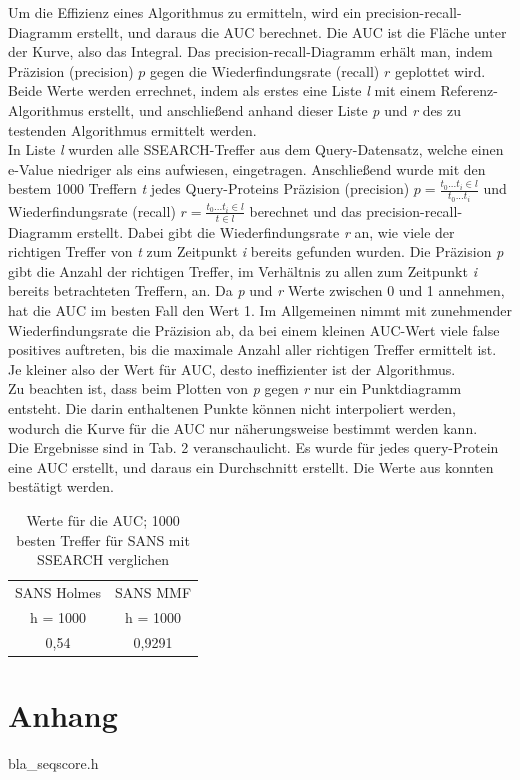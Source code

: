 \documentclass{article}
\begin{document}
Um die Effizienz eines Algorithmus zu ermitteln, wird ein precision-recall-Diagramm erstellt, und daraus die AUC berechnet. Die AUC ist die Fläche unter der Kurve, also das Integral. Das precision-recall-Diagramm erhält man, indem Präzision (precision) $p$ gegen die Wiederfindungsrate (recall) $r$ geplottet wird. Beide Werte werden errechnet, indem als erstes eine Liste \textit l mit einem Referenz-Algorithmus erstellt, und anschließend anhand dieser Liste \textit p und \textit r des zu testenden Algorithmus ermittelt werden.\\In Liste \textit l wurden alle SSEARCH-Treffer aus dem Query-Datensatz, welche einen e-Value niedriger als eins aufwiesen, eingetragen. Anschließend wurde mit den bestem 1000 Treffern \textit t jedes Query-Proteins Präzision (precision) $p = \frac{t_0 ... t_i \in l}{t_0 ... t_i}$ und Wiederfindungsrate (recall) $r = \frac {t_0 ... t_i \in l}{t \in l}$ berechnet und das precision-recall-Diagramm erstellt. Dabei gibt die Wiederfindungsrate \textit r an, wie viele der richtigen Treffer von \textit t zum Zeitpunkt \textit i bereits gefunden wurden. Die Präzision \textit p gibt die Anzahl der richtigen Treffer, im Verhältnis zu allen zum Zeitpunkt \textit i bereits betrachteten Treffern, an. Da \textit p und \textit r Werte zwischen 0 und 1 annehmen, hat die AUC im besten Fall den Wert 1. Im Allgemeinen nimmt mit zunehmender Wiederfindungsrate die Präzision ab, da bei einem kleinen AUC-Wert viele false positives auftreten, bis die maximale Anzahl aller richtigen Treffer ermittelt ist. Je kleiner also der Wert für AUC, desto ineffizienter ist der Algorithmus.\\Zu beachten ist, dass beim Plotten von \textit p gegen \textit r nur ein Punktdiagramm entsteht. Die darin enthaltenen Punkte können nicht interpoliert werden, wodurch die Kurve für die AUC nur näherungsweise bestimmt werden kann.\\Die Ergebnisse sind in Tab. 2 veranschaulicht. Es wurde für jedes query-Protein eine AUC erstellt, und daraus ein Durchschnitt erstellt. Die Werte aus \cite{Holm} konnten bestätigt werden.

  \begin{table}[h]
  \centering
    \caption{Werte für die AUC; 1000 besten Treffer für SANS mit SSEARCH verglichen}
    \begin{tabular}{cc}
      \hline
      SANS Holmes & SANS MMF\\
      h = 1000 & h = 1000\\
      \hline
      0,54 & 0,9291\\
      \hline
    \end{tabular}
  \end{table}

\section{Anhang}

bla\_seqscore.h

{}

\end{document}
